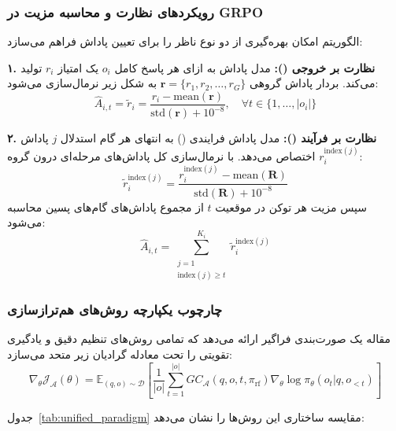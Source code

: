 \subsubsection*{رویکردهای نظارت و محاسبه مزیت در GRPO}

الگوریتم  امکان بهره‌گیری از دو نوع ناظر را برای تعیین پاداش فراهم می‌سازد:

\textbf{۱. نظارت بر خروجی ():}
مدل پاداش به ازای هر پاسخ کامل $o_i$ یک امتیاز $r_i$ تولید می‌کند. بردار پاداش گروهی $\mathbf{r} = \{r_1, r_2, \dots, r_G\}$ به شکل زیر نرمال‌سازی می‌شود:
\begin{equation}
	\hat{A}_{i,t} = \tilde{r}_i = \frac{r_i - \text{mean}(\mathbf{r})}{\text{std}(\mathbf{r}) + 10^{-8}}, \quad \forall t \in \{1, \dots, |o_i|\}
\end{equation}

\textbf{۲. نظارت بر فرآیند ():}
مدل پاداش فرایندی () \cite{lightman2023let, wang2023math} به انتهای هر گام استدلال $j$ پاداش $r_i^{\text{index}(j)}$ اختصاص می‌دهد. با نرمال‌سازی کل پاداش‌های مرحله‌ای درون گروه:
\begin{equation}
	\tilde{r}_i^{\text{index}(j)} = \frac{r_i^{\text{index}(j)} - \text{mean}(\mathbf{R})}{\text{std}(\mathbf{R}) + 10^{-8}}
\end{equation}
سپس مزیت هر توکن در موقعیت $t$ از مجموع پاداش‌های گام‌های پسین محاسبه می‌شود:
\begin{equation}
	\hat{A}_{i,t} = \sum_{\substack{j=1 \\ \text{index}(j) \ge t}}^{K_i} \tilde{r}_i^{\text{index}(j)}
\end{equation}

\subsubsection*{چارچوب یکپارچه روش‌های هم‌ترازسازی}

مقاله یک صورت‌بندی فراگیر ارائه می‌دهد که تمامی روش‌های تنظیم دقیق و یادگیری تقویتی را تحت معادله گرادیان زیر متحد می‌سازد:
\begin{equation}
	\nabla_\theta \mathcal{J}_{\mathcal{A}}(\theta) = \mathbb{E}_{(q, o) \sim \mathcal{D}} \left[ \frac{1}{|o|} \sum_{t=1}^{|o|} GC_{\mathcal{A}}(q, o, t, \pi_{\text{rf}}) \nabla_\theta \log \pi_\theta(o_t | q, o_{<t}) \right]
\end{equation}

جدول~\ref{tab:unified_paradigm} مقایسه ساختاری این روش‌ها را نشان می‌دهد:

